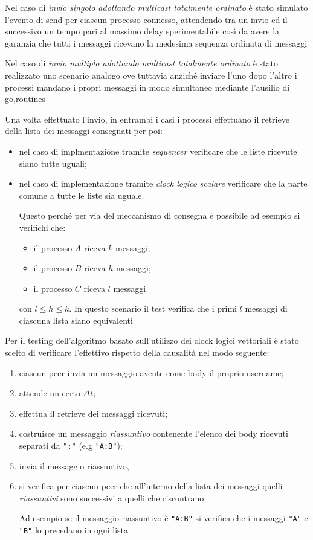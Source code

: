 \documentclass[conference]{IEEEtran}
\begin{document}
Nel caso di \textsl{invio singolo adottando multicast totalmente ordinato} è stato simulato l'evento di send per ciascun processo connesso, attendendo tra un invio ed il successivo un tempo pari al massimo delay sperimentabile così da avere la garanzia che tutti i messaggi ricevano la medesima sequenza ordinata di messaggi

Nel caso di \textsl{invio multiplo adottando multicast totalmente ordinato} è stato realizzato uno scenario analogo ove tuttavia anziché inviare l'uno dopo l'altro i processi mandano i propri messaggi in modo simultaneo mediante l'ausilio di go,routines

Una volta effettuato l'invio, in entrambi i casi i processi effettuano il retrieve della lista dei messaggi consegnati per poi:
\begin{itemize}
\item nel caso di implmentazione tramite \textsl{sequencer} verificare che le liste ricevute siano tutte uguali;
\item nel caso di implementazione tramite \textsl{clock logico scalare} verificare che la parte comune a tutte le liste sia uguale.

Questo perché per via del meccanismo di consegna è possibile ad esempio si verifichi che:
\begin{itemize}
\item il processo $A$ riceva $k$ messaggi;
\item il processo $B$ riceva $h$ messaggi;
\item il processo $C$ riceva $l$ messaggi
\end{itemize}
con $l\leq h\leq k$. In questo scenario il test verifica che i primi $l$ messaggi di ciascuna lista siano equivalenti
\end{itemize}


Per il testing dell'algoritmo basato sull'utilizzo dei clock logici vettoriali è stato scelto di verificare l'effettivo rispetto della causalità nel modo seguente:
\begin{enumerate}
\item ciascun peer invia un messaggio avente come body il proprio username;
\item attende un certo $\Delta t$;
\item effettua il retrieve dei messaggi ricevuti;
\item costruisce un messaggio \textit{riassuntivo} contenente l'elenco dei body ricevuti separati da \texttt{":"} (e.g \texttt{"A:B"});
\item invia il messaggio riassuntivo,
\item si verifica per ciascun peer che all'interno della lista dei messaggi quelli \textit{riassuntivi} sono successivi a quelli che riscontrano.

Ad esempio se il messaggio riassuntivo è \texttt{"A:B"} si verifica che i messaggi \texttt{"A"} e \texttt{"B"} lo precedano in ogni lista
\end{enumerate}
\end{document}
